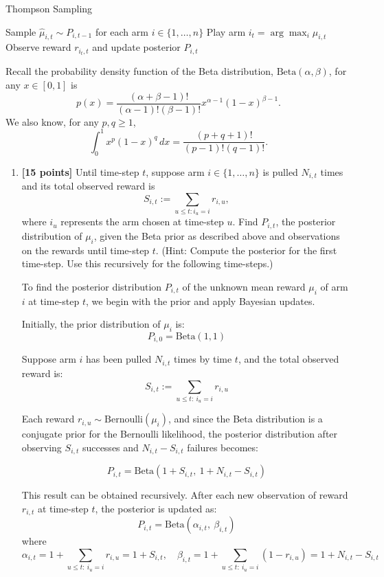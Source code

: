 \documentclass[a3paper,12pt]{extarticle} %
\begin{document}
\begin{algorithm}
\caption{Thompson Sampling}
\begin{algorithmic}[1]
    \State Sample $\hat{\mu}_{i,t} \sim P_{i,t-1}$ for each arm $i \in \{1, \ldots, n\}$
    \State Play arm $i_t = \arg \max_i \hat{\mu}_{i,t}$
    \State Observe reward $r_{i_t,t}$ and update posterior $P_{i,t}$
\EndFor
\end{algorithmic}
\end{algorithm}
Recall the probability density function of the Beta distribution, $\text{Beta}(\alpha, \beta)$, for any $x \in [0, 1]$ is
\[
p(x) = \frac{(\alpha + \beta - 1)!}{(\alpha - 1)!(\beta - 1)!} x^{\alpha - 1} (1 - x)^{\beta - 1}.
\]
We also know, for any $p, q \geq 1$,
\[
\int_0^1 x^p (1 - x)^q \, dx = \frac{(p + q + 1)!}{(p - 1)!(q - 1)!}.
\]
\begin{enumerate}
    \item \textbf{[15 points]} Until time-step $t$, suppose arm $i \in \{1, \ldots, n\}$ is pulled $N_{i,t}$ times and its total observed reward is 
    \[
    S_{i,t} := \sum_{u \leq t : i_u = i} r_{i,u},
    \]
    where $i_u$ represents the arm chosen at time-step $u$. Find $P_{i,t}$, the posterior distribution of $\mu_i$, given the Beta prior as described above and observations on the rewards until time-step $t$. 
    (Hint: Compute the posterior for the first time-step. Use this recursively for the following time-steps.)

    To find the posterior distribution $P_{i,t}$ of the unknown mean reward $\mu_i$ of arm $i$ at time-step $t$, we begin with the prior and apply Bayesian updates.

Initially, the prior distribution of $\mu_i$ is:
\[
P_{i,0} = \text{Beta}(1, 1)
\]

Suppose arm $i$ has been pulled $N_{i,t}$ times by time $t$, and the total observed reward is:
\[
S_{i,t} := \sum_{u \leq t:\ i_u = i} r_{i,u}
\]

Each reward $r_{i,u} \sim \text{Bernoulli}(\mu_i)$, and since the Beta distribution is a conjugate prior for the Bernoulli likelihood, the posterior distribution after observing $S_{i,t}$ successes and $N_{i,t} - S_{i,t}$ failures becomes:

\[
P_{i,t} = \text{Beta}(1 + S_{i,t},\ 1 + N_{i,t} - S_{i,t})
\]

This result can be obtained recursively. After each new observation of reward $r_{i,t}$ at time-step $t$, the posterior is updated as:
\[
P_{i,t} = \text{Beta}(\alpha_{i,t},\ \beta_{i,t})
\]
where
\[
\alpha_{i,t} = 1 + \sum_{u \leq t:\ i_u = i} r_{i,u} = 1 + S_{i,t}, \quad
\beta_{i,t} = 1 + \sum_{u \leq t:\ i_u = i} (1 - r_{i,u}) = 1 + N_{i,t} - S_{i,t}
\]


\end{enumerate}
\end{document}

